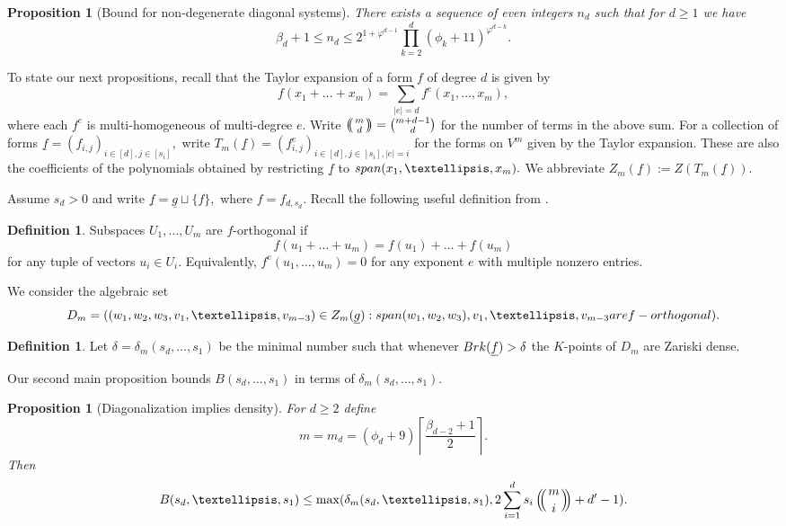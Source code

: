 \documentclass[10pt,a4paper]{amsart}
\let\ul\underline
\newtheorem{proposition}[theorem]{Proposition}
\theoremstyle{definition}
\newtheorem{definition}[theorem]{Definition}
\def\multiset#1#2{\ensuremath{\left(\kern-.3em\left(\genfrac{}{}{0pt}{}{#1}{#2}\right)\kern-.3em\right)}}
\renewcommand{\sp}{\textnormal{span}}
\newcommand{\brk}{\textnormal{Brk}}
\begin{document}
\begin{proposition}[Bound for non-degenerate diagonal systems]\label{prop:beta-bound}
    There exists a sequence of even integers $n_d$ such that for $d\ge 1$ we have
    \[
    \beta_d+1 \le n_d \le  2^{1+\varphi^{d-1}}\prod_{k=2}^{d} (\phi_k+11) ^{\varphi^{d-k}}.
    \]
\end{proposition}

To state our next propositions, recall that the Taylor expansion of a form $f$ of degree $d$ is given by
\[
f(x_1+\ldots+x_m) = \sum_{|e| = d} f^e(x_1,\ldots,x_m),
\]
where each $f^e$ is multi-homogeneous of multi-degree $e.$ Write $\multiset{m}{d} = \binom{m+d-1}{d}$ for the number of terms in the above sum. For a collection of forms $\ul{f} = (f_{i,j})_{i\in [d],j\in [s_i]},$ write $T_m(\ul{f}) = (f_{i,j}^e)_{i\in [d],j\in [s_i],|e|=i}$ for the forms on $V^m$ given by the Taylor expansion. These are also the coefficients of the polynomials obtained by restricting $\ul{f}$ to $\sp(x_1,\ldots,x_m).$ We abbreviate $Z_m(\ul{f}) := Z(T_m(\ul{f})).$





Assume $s_d>0$ and write $\ul{f} = \ul{g} \sqcup \{f\},$ where $f = f_{d,s_d}.$ Recall the following useful definition from \cite{BDS}.

\begin{definition}
    Subspaces $U_1,\ldots,U_m$ are $f$-orthogonal if
    \[
    f(u_1+\ldots+u_m) = f(u_1)+\ldots+f(u_m)
    \]
    for any tuple of vectors $u_i\in U_i.$ Equivalently, $f^e(u_1,\ldots,u_m) = 0$ for any exponent $e$ with multiple nonzero entries.  
\end{definition}


We consider the algebraic set 
\[
D_m = ((w_1,w_2,w_3,v_1,\ldots,v_{m-3})\in Z_m(\ul{g}): \sp(w_1,w_2,w_3),v_1,\ldots,v_{m-3} \textnormal{ are } f\textnormal{-orthogonal}).
\]


\begin{definition}
   Let $\delta = \delta_m(s_d,\ldots,s_1)$ be the minimal number such that whenever $\brk(\ul{f}) > \delta$ the $K$-points of $D_m$ are Zariski dense. 
\end{definition}

Our second main proposition bounds $B(s_d,\ldots,s_1)$ in terms of $\delta_m(s_d,\ldots,s_1).$

\begin{proposition}[Diagonalization implies density]\label{prop:diag-to-good}
    For $d\ge 2$ define
    \[
    m = m_d = (\phi_d+9)\left\lceil \frac{\beta_{d-2}+1}{2} \right\rceil.
    \]
    Then 
    $$B(s_d,\ldots,s_1) \le \max(\delta_m(s_d,\ldots,s_1), 2 \sum_{i=1}^d s_i \multiset{m}{i}+d'-1).$$
\end{proposition}
\end{document}
